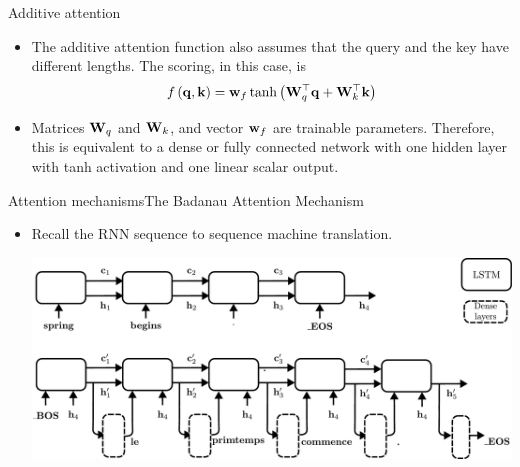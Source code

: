 \documentclass{beamer}
\begin{document}
\begin{frame}{Additive attention}
\begin{itemize}
    \item The additive attention function also assumes that the query and the key have different lengths. The  scoring, in this case, is
    \begin{equation}\label{eq:additive_attention}
         f\left({\bf q},{\bf k} \right) = {\bf w}_f \tanh \left( {\bf W}_q^\top {\bf q} + {\bf W}_k^\top {\bf k}\right)
    \end{equation}

 \item Matrices ${\bf W}_q$ and ${\bf W}_k$, and vector ${\bf w}_f$ are trainable parameters. Therefore, this is equivalent to a dense or fully connected network with one hidden layer with tanh activation and one linear scalar output.
 \end{itemize}
\end{frame}

\begin{frame}{Attention mechanisms}{The Badanau Attention Mechanism}
\begin{itemize}
    \item Recall the RNN sequence to sequence machine translation. 
    \begin{center}
\includegraphics[scale= 0.3]{Module 6 (Attention-based networks)/pics/sequence_translate_RNN_detailed.pdf}
  \end{center}
\end{itemize}
\end{frame}
\end{document}
